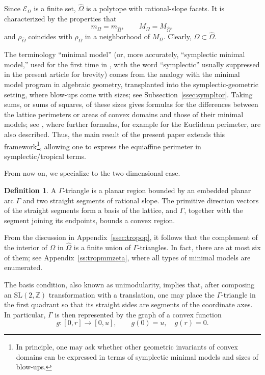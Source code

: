 \documentclass[a4paper,american,11pt]{amsart}
\theoremstyle{plain}
\theoremstyle{definition}
\newtheorem{definition}[theorem]{Definition}
\newcommand{\Z}{\mathbb Z}
\begin{document}
Since \(\mathcal E_\Omega\) is a finite set, \(\widehat\Omega\) is a polytope
with rational-slope facets. It is characterized by the properties that
\[
m_\Omega=m_{\widehat\Omega},
\qquad
M_\Omega=M_{\widehat\Omega},
\]
and \(\rho_{\widehat\Omega}\) coincides with \(\rho_\Omega\) in a neighborhood
of \(M_\Omega\). Clearly, \(\Omega\subset\widehat\Omega\).

The terminology ``minimal model'' (or, more accurately, ``symplectic minimal
model,'' used for the first time in \cite{Shkolnikov17Theis}, with the word
``symplectic'' usually suppressed in the present article for brevity) comes
from the analogy with the minimal model program in algebraic geometry,
transplanted into the symplectic-geometric setting, where blow-ups come with
sizes; see Subsection~\ref{ssec:sympltor}. Taking sums, or sums of squares, of
these sizes gives formulas for the differences between the lattice perimeters
or areas of convex domains and those of their minimal models; see
\cite{kalinin2017number,kalinin2019tropical}, where further formulas, for
example for the Euclidean perimeter, are also described. Thus, the main result
of the present paper extends this framework\footnote{In principle, one may ask
whether other geometric invariants of convex domains can be expressed in terms
of symplectic minimal models and sizes of blow-ups.}, allowing one to express
the equiaffine perimeter in symplectic/tropical terms.

From now on, we specialize to the two-dimensional case.

\begin{definition}
A \(\Gamma\)-triangle is a planar region bounded by an embedded planar arc
\(\Gamma\) and two straight segments of rational slope. The primitive direction
vectors of the straight segments form a basis of the lattice, and \(\Gamma\),
together with the segment joining its endpoints, bounds a convex region.
\end{definition}

From the discussion in Appendix~\ref{ssec:tropop}, it follows that the
complement of the interior of \(\Omega\) in \(\widehat\Omega\) is a finite
union of \(\Gamma\)-triangles. In fact, there are at most six of them; see
Appendix~\ref{ss:tropmmzeta}, where all types of minimal models are
enumerated.

The basis condition, also known as unimodularity, implies that, after
composing an \(\mathrm{SL}(2,\Z)\) transformation with a translation, one may
place the \(\Gamma\)-triangle in the first quadrant so that its straight sides
are segments of the coordinate axes. In particular, \(\Gamma\) is then
represented by the graph of a convex function
\[
g:[0,r]\to[0,u],
\qquad
g(0)=u,\quad g(r)=0.
\]
\end{document}
